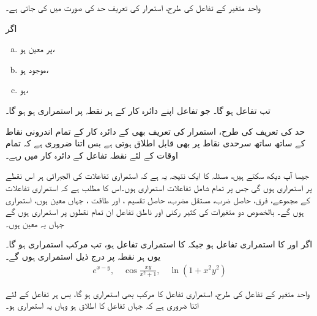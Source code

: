 واحد متغیر کے تفاعل کی طرح، استمرار کی تعریف  حد کی صورت میں کی جاتی ہے۔

اگر 
\begin{enumerate}[a.]
\item
{} پر  معین ہو،
\item
{} موجود ہو،
\item
{} ہو،
\end{enumerate} 
تب تفاعل       ہو گا۔ جو   تفاعل    اپنے دائرہ کار کے  ہر نقطہ پر استمراری ہو ہو گا۔

حد کی تعریف کی طرح،  استمرار کی تعریف بھی  کے دائرہ کار کے تمام اندرونی نقاط کے ساتھ  ساتھ  سرحدی نقاط پر بھی قابل اطلاق  ہوتی ہے بس اتنا ضروری ہے کہ تمام اوقات کے لئے    نقطہ تفاعل کے دائرہ کار میں رہے۔

جیسا آپ  دیکھ سکتے ہیں، مسئلہ     کا ایک نتیجہ  یہ ہے  کہ استمراری تفاعلات   کی  الجبرائی     ہر اس نقطے  پر استمراری ہوں گی جس پر تمام شامل تفاعلات  استمراری ہوں۔اس کا مطلب ہے کہ  استمراری     تفاعلات  کے مجموعے، فرق، حاصل ضرب،  مستقل مضرب، حاصل تقسیم ، اور طاقت ، جہاں معین ہوں،  استمراری ہوں گے۔   بالخصوص دو متغیرات کی کثیر رکنی اور ناطق تفاعل ان تمام نقطوں پر استمراری ہوں گے جہاں یہ معین ہوں۔


اگر   اور  کا استمراری تفاعل   ہو  جبکہ   کا استمراری تفاعل  ہو، تب  مرکب     استمراری ہو گا۔یوں  ہر نقطہ  پر درج ذیل استمراری ہوں گے۔
\begin{align*}
e^{x-y},\quad \cos\frac{xy}{x^2+1},\quad \ln(1+x^2y^2)
\end{align*}

واحد متغیر کے تفاعل کی طرح، استمراری تفاعل کا  مرکب  بھی استمراری ہو گا،  بس ہر  تفاعل کے لئے  اتنا ضروری ہے کہ جہاں   تفاعل کا اطلاق ہو  وہاں یہ   استمراری ہو۔

